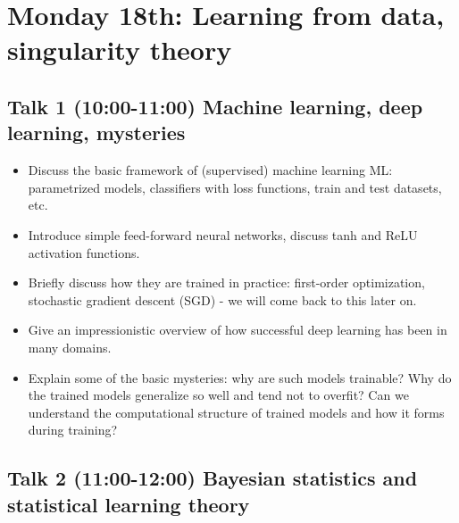 \documentclass[a4paper,11pt]{amsart}
\begin{document}
\section*{Monday 18th: Learning from data, singularity theory}

\subsection*{Talk 1 (10:00-11:00) Machine learning, deep learning, mysteries}

\begin{itemize}
\item Discuss the basic framework of (supervised) machine learning ML: parametrized models, classifiers with loss functions, train and test datasets, etc.
\item Introduce simple feed-forward neural networks, discuss tanh and ReLU activation functions.
\item Briefly discuss how they are trained in practice: first-order optimization, stochastic gradient descent (SGD) - we will come back to this later on.
\item Give an impressionistic overview of how successful deep learning has been in many domains.
\item Explain some of the basic mysteries: why are such models trainable? Why do the trained models generalize so well and tend not to overfit? Can we understand the computational structure of trained models and how it forms during training?  
\end{itemize}

\subsection*{Talk 2 (11:00-12:00) Bayesian statistics and statistical learning theory}
\end{document}
